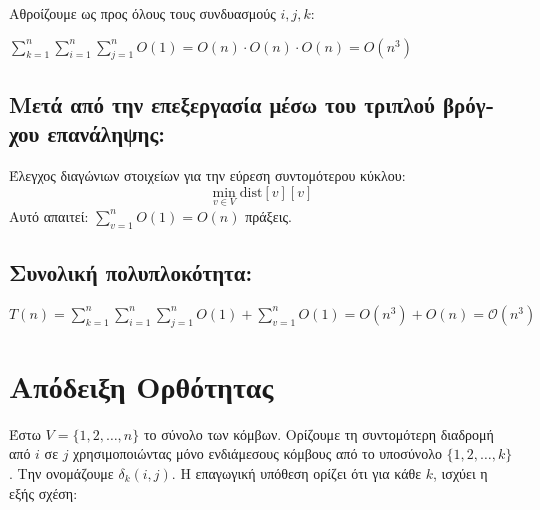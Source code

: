 \documentclass{article}
\begin{document}
\textgreek{Αθροίζουμε ως προς όλους τους συνδυασμούς \( i, j, k \):}

$\sum_{k=1}^{n} \sum_{i=1}^{n} \sum_{j=1}^{n} O(1) = O(n) \cdot O(n) \cdot O(n) = O(n^3)$

\subsection*{\textgreek{Μετά από την επεξεργασία μέσω του τριπλού βρόγχου επανάληψης: }}

\textgreek{\textgreek{Έλεγχος διαγώνιων στοιχείων για την εύρεση συντομότερου κύκλου: }}
\[
\min_{v \in V} \text{dist}[v][v]
\]
\textgreek{Αυτό απαιτεί: }  $\sum_{v=1}^{n} O(1) = O(n)$  \textgreek{ πράξεις.}

\subsection*{\textgreek{Συνολική πολυπλοκότητα: }}

$T(n) = \sum_{k=1}^{n} \sum_{i=1}^{n} \sum_{j=1}^{n} O(1) + \sum_{v=1}^{n} O(1) = O(n^3) 
+ O(n) = \mathcal{O}(n^3)$



\section*{\textgreek{Απόδειξη Ορθότητας}}

\textgreek{Έστω $V = \{1, 2, \dots, n\}$ το σύνολο των κόμβων. Ορίζουμε τη συντομότερη διαδρομή από $i$ σε $j$ χρησιμοποιώντας μόνο ενδιάμεσους κόμβους από το υποσύνολο $\{1, 2, \dots, k\}$. Την ονομάζουμε $\delta_k(i,j)$. Η επαγωγική υπόθεση ορίζει ότι για κάθε $k$, ισχύει η εξής σχέση:}
\end{document}
